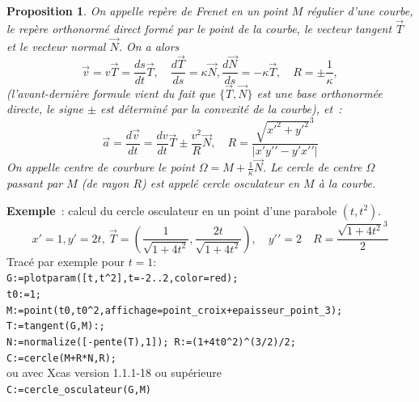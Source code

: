 \documentclass[a4paper,11pt]{article}
\newtheorem{prop}[thm]{Proposition}
\begin{document}
\begin{prop}
On appelle repère de Frenet 
en un point $M$ r\'egulier d'une courbe, 
le repère orthonorm\'e direct form\'e par
le point de la courbe, le vecteur tangent $\overrightarrow{T}$ 
et le vecteur normal $\overrightarrow{N}$. On a alors
$$ \overrightarrow{v}=v \overrightarrow{T}=\frac{ds}{dt}\overrightarrow{T}, \quad \frac{d
  \overrightarrow{T}}{ds}=\kappa \overrightarrow{N}, 
\frac{d\overrightarrow{N}}{ds}=-\kappa \overrightarrow{T},
\quad R=\pm\frac1\kappa, 
$$
(l'avant-derni\`ere formule vient du fait que $\{ \overrightarrow{T}
,\overrightarrow{N} \}$ est une base orthonorm\'ee directe, le signe
$\pm$ est d\'etermin\'e par la convexit\'e de la courbe), et~:
$$
\overrightarrow{a}=\frac{d\overrightarrow{v}}{dt}=\frac{dv}{dt} \overrightarrow{T} \pm
\frac{v^2}{R} \overrightarrow{N}, \quad
R=\frac{\sqrt{x'^2+y'^2}^3}{|x'y'{'}-y'x'{'}|}$$
On appelle centre de courbure le point $\Omega=M+\frac1\kappa
\overrightarrow{N}$. Le cercle de centre $\Omega$ passant par $M$
(de rayon $R$)
est appel\'e cercle osculateur en $M$ \`a la courbe.
\end{prop}
{\bf Exemple}~: calcul du cercle osculateur en un point d'une parabole
$(t,t^2)$.
$$ x'=1, y'=2t, \ 
\overrightarrow{T}=(\frac1{\sqrt{1+4t^2}},\frac{2t}{\sqrt{1+4t^2}}), \quad
y'{'}=2\quad R=\frac{\sqrt{1+4t^2}^3}{2}$$
Trac\'e par exemple pour $t=1$:\\
\verb|G:=plotparam([t,t^2],t=-2..2,color=red); |\\
\verb|t0:=1;|\\
\verb|M:=point(t0,t0^2,affichage=point_croix+epaisseur_point_3);|\\
\verb|T:=tangent(G,M):;|\\
\verb|N:=normalize([-pente(T),1]); R:=(1+4t0^2)^(3/2)/2; |\\
\verb|C:=cercle(M+R*N,R);|\\
ou avec Xcas version 1.1.1-18 ou sup\'erieure\\
\verb|C:=cercle_osculateur(G,M)|
\end{document}
